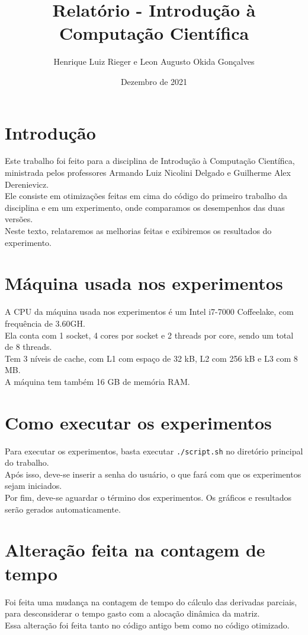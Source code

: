 \documentclass{article}
\title{Relatório - Introdução à Computação Científica}
\author{Henrique Luiz Rieger e Leon Augusto Okida Gonçalves}
\date{Dezembro de 2021}
\begin{document}
\maketitle

\newpage
\section{Introdução}
Este trabalho foi feito para a disciplina de Introdução à Computação Científica, ministrada pelos professores Armando Luiz Nicolini Delgado e Guilherme Alex Derenievicz.\\
Ele consiste em otimizações feitas em cima do código do primeiro trabalho da disciplina e em um experimento, onde comparamos os desempenhos das duas versões.\\
Neste texto, relataremos as melhorias feitas e exibiremos os resultados do experimento.

\newpage
\section{Máquina usada nos experimentos}
A CPU da máquina usada nos experimentos é um Intel i7-7000 Coffeelake, com frequência de 3.60GH.\\
Ela conta com 1 socket, 4 cores por socket e 2 threads por core, sendo um total de 8 threads.\\
Tem 3 níveis de cache, com L1 com espaço de 32 kB, L2 com 256 kB e L3 com 8 MB.\\
A máquina tem também 16 GB de memória RAM.

\newpage
\section{Como executar os experimentos}
Para executar os experimentos, basta executar \texttt{./script.sh} no diretório principal do trabalho.\\
Após isso, deve-se inserir a senha do usuário, o que fará com que os experimentos sejam iniciados.\\
Por fim, deve-se aguardar o término dos experimentos. Os gráficos e resultados serão gerados automaticamente.

\newpage
\section{Alteração feita na contagem de tempo}
Foi feita uma mudança na contagem de tempo do cálculo das derivadas parciais, para desconsiderar o tempo gasto com a alocação dinâmica da matriz.\\
Essa alteração foi feita tanto no código antigo bem como no código otimizado.
\end{document}
